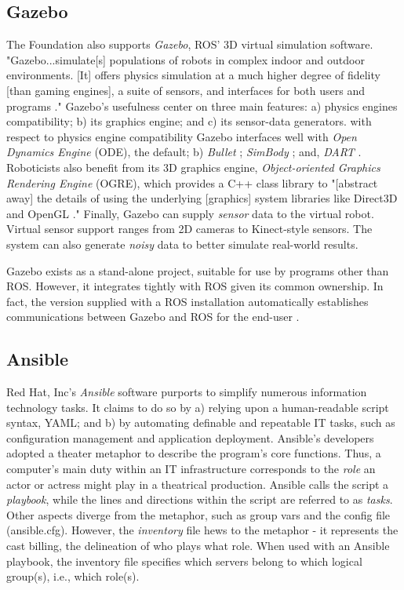 \documentclass[9pt,twocolumn,twoside]{../../styles/osajnl}
\begin{document}
\subsection{Gazebo}
The Foundation also supports \textit{Gazebo}, ROS' 3D virtual simulation software.  "Gazebo...simulate[s] populations of robots in complex indoor and outdoor environments. [It] offers physics simulation at a much higher degree of fidelity [than gaming engines], a suite of sensors, and interfaces for both users and programs \cite{www-gazebo-overview}."  Gazebo's usefulness center on three main features: a) physics engines compatibility; b) its graphics engine; and c) its sensor-data generators.  with respect to physics engine compatibility Gazebo interfaces well with \textit{Open Dynamics Engine} \cite{www-ode-homepage} (ODE), the default; b) \textit{Bullet} \cite{www-bullet-homepage}; \textit{SimBody} \cite{www-simbody-homepage}; and, \textit{DART} \cite{www-dart-homepage}. Roboticists also benefit from its 3D graphics engine, \textit{Object-oriented Graphics Rendering Engine} \cite{www-ogre-homepage} (OGRE), which provides a C++ class library to "[abstract away] the details of using the underlying [graphics] system libraries like Direct3D and OpenGL \cite{www-ogre-about}."  Finally, Gazebo can supply \textit{sensor} data to the virtual robot.  Virtual sensor support ranges from 2D cameras to Kinect-style sensors.  The system can also generate \textit{noisy} data to better simulate real-world results.

Gazebo exists as a stand-alone project, suitable for use by programs other than ROS.  However, it integrates tightly with ROS given its common ownership.  In fact, the version supplied with a ROS installation automatically establishes communications between Gazebo and ROS for the end-user \cite{www-gazebo-ros}.  

\subsection{Ansible}
Red Hat, Inc's \cite{www-redhat} \textit{Ansible} software purports to simplify numerous information technology tasks.  It claims to do so by a) relying upon a human-readable script syntax, YAML; and b) by automating definable and repeatable IT tasks, such as configuration management and application deployment.  Ansible's developers adopted a theater metaphor to describe the program's core functions.  Thus, a computer's main duty within an IT infrastructure corresponds to the \textit{role} an actor or actress might play in a theatrical production.  Ansible calls the script a \textit{playbook}, while the lines and directions within the script are referred to as \textit{tasks}.  Other aspects diverge from the metaphor, such as group vars and the config file (ansible.cfg).  However, the \textit{inventory} file hews to the metaphor - it represents the cast billing, the delineation of who plays what role.  When used with an Ansible playbook, the inventory file specifies which servers belong to which logical group(s), i.e., which role(s). 
\end{document}
